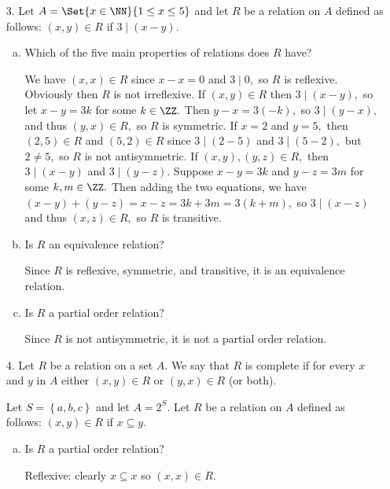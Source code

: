 \documentclass{article}
\begin{document}
\begin{itemize}
\begin{enumerate}[(a)]
		\end{enumerate}

	\item[3.] Let $A=\Set{x\in\NN}{1\le x\le 5}$ and let $R$ be a relation on $A$ defined as follows: $(x, y)\in R$ if $3\mid(x-y).$
		\begin{enumerate}[(a)]
			\item Which of the five main properties of relations does $R$ have?
				\begin{soln}
					We have $(x, x)\in R$ since $x-x=0$ and $3\mid 0,$ so $R$ is reflexive. Obviously then $R$ is not irreflexive. If $(x, y)\in R$ then $3\mid (x-y),$ so let $x-y=3k$ for some $k\in\ZZ.$ Then $y-x=3(-k),$ so $3\mid (y-x),$ and thus $(y, x)\in R,$ so $R$ is symmetric. If $x=2$ and $y=5,$ then $(2, 5)\in R$ and $(5, 2)\in R$ since $3\mid (2-5)$ and $3\mid (5-2),$ but $2\neq 5,$ so $R$ is not antisymmetric. If $(x, y), (y, z)\in R,$ then $3\mid (x-y)$ and $3\mid (y-z).$ Suppose $x-y=3k$ and $y-z=3m$ for some $k, m\in\ZZ.$ Then adding the two equations, we have $(x-y)+(y-z)=x-z=3k+3m=3(k+m),$ so $3\mid (x-z)$ and thus $(x, z)\in R,$ so $R$ is transitive.
				\end{soln}

			\item Is $R$ an equivalence relation?
				\begin{answer*}
					Since $R$ is reflexive, symmetric, and transitive, it is an equivalence relation.
				\end{answer*}

			\item Is $R$ a partial order relation?
				\begin{answer*}
					Since $R$ is not antisymmetric, it is not a partial order relation.
				\end{answer*}
				
		\end{enumerate}

	\item[4.] Let $R$ be a relation on a set $A.$ We say that $R$ is complete if for every $x$ and $y$ in $A$ either $(x, y)\in R$ or $(y, x)\in R$ (or both).

		Let $S=\left\{ a, b, c \right\}$ and let $A=2^S.$ Let $R$ be a relation on $A$ defined as follows: $(x, y)\in R$ if $x\subseteq y.$
		\begin{enumerate}[(a)]
			\item Is $R$ a partial order relation?
				\begin{soln}
					Reflexive: clearly $x\subseteq x$ so $(x, x)\in R.$


\end{soln}
\end{enumerate}
\end{itemize}
\end{document}
